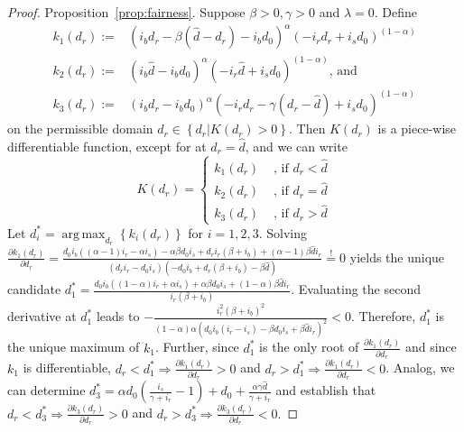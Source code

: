 \documentclass[a4paper,11pt]{article}
\newcommand{\dref}{\widehat d}
\newcommand{\equalD}{\overset{!}{=}}
\renewcommand{\~}[1]{\tilde{#1}}
\renewcommand{\-}[1]{\overline{#1}}
\DeclareMathOperator*{\argmax}{arg\,max}
\begin{document}
\begin{appendices}
\begin{proof}{Proposition~\ref{prop:fairness}.}
Suppose $\beta>0, \gamma>0$ and $\lambda=0$. Define 
\begin{equation}\label{eq:k}
    \begin{aligned}
k_1\left(d_r\right) := &    \left(
i_bd_r - \beta \left(\dref-d_r\right) - i_bd_0
\right)^\alpha
\left(
-i_rd_r  +i_sd_0
\right)^{\left(1-\alpha\right)}\\
k_2\left(d_r\right) :=& \left(
i_b\dref- i_bd_0
\right)^\alpha
\left(
-i_r\dref +i_sd_0
\right)^{\left(1-\alpha\right)} \text{, and}\\
k_3\left(d_r\right) :=& \left(
i_bd_r - i_bd_0
\right)^\alpha
\left(
-i_rd_r - \gamma \left(d_r-\dref\right)  + i_sd_0
\right)^{\left(1-\alpha\right)}
    \end{aligned}
\end{equation}
on the permissible domain $d_r\in\left\{d_r|K\left(d_r\right)>0\right\}$. Then $K\left(d_r\right)$ is a piece-wise differentiable function, except for at $d_r=\dref$, and we can write%
\begin{equation}\label{eq:K}
K\left(d_r\right) = \begin{cases}
k_1\left(d_r\right) & \text{ , if } d_r < \dref\\
k_2\left(d_r\right) & \text{ , if } d_r = \dref\\
k_3\left(d_r\right)& \text{ , if }  d_r > \dref
\end{cases}
\end{equation}
Let $d_i^* = \argmax_{d_r}\left\{k_i\left(d_r\right)\right\}$ for $i=1,2,3$.\newline
Solving $\frac{\partial k_1\left(d_r\right) }{\partial d_r}=\frac{d_0 i_b ((\alpha -1) i_r-\alpha  i_s)-\alpha  \beta  d_0 i_s+d_r i_r (\beta +i_b)+(\alpha -1) \beta  \dref i_r}{(d_r i_r-d_0 i_s) (-d_0 i_b+d_r (\beta +i_b)-\beta  \dref)}\equalD 0$ yields the unique candidate\newline
$d_1^* = \frac{d_0 i_b ((1-\alpha)  i_r+\alpha  i_s)+\alpha  \beta  d_0 i_s+(1-\alpha) \beta  \dref i_r}{i_r (\beta +i_b)}$. Evaluating the second derivative at $d_1^*$ leads to\newline
$-\frac{i_r^2 (\beta +i_b)^2}{(1-\alpha) \alpha  \left(d_0 i_b (i_r-i_s)-\beta  d_0 i_s+\beta  \dref i_r\right)^2}<0$. Therefore, $d_1^*$ is the unique maximum of $k_1$. Further, since $d_1^*$ is the only root of $\frac{\partial k_1\left(d_r\right) }{\partial d_r}$ and since $k_1$ is differentiable, $d_r<d_1^*\Rightarrow \frac{\partial k_1\left(d_r\right) }{\partial d_r}>0 $ and $d_r>d_1^*\Rightarrow \frac{\partial k_1\left(d_r\right) }{\partial d_r}<0$. Analog, we can determine $d_3^*=\alpha  d_0 \left(\frac{i_s}{\gamma +i_r}-1\right)+d_0+\frac{\alpha  \gamma  \dref}{\gamma +i_r}$ and establish that $d_r<d_3^*\Rightarrow \frac{\partial k_3\left(d_r\right) }{\partial d_r}>0$ and $d_r>d_3^*\Rightarrow \frac{\partial k_3\left(d_r\right) }{\partial d_r}<0.$


\end{proof}
\end{appendices}
\end{document}
